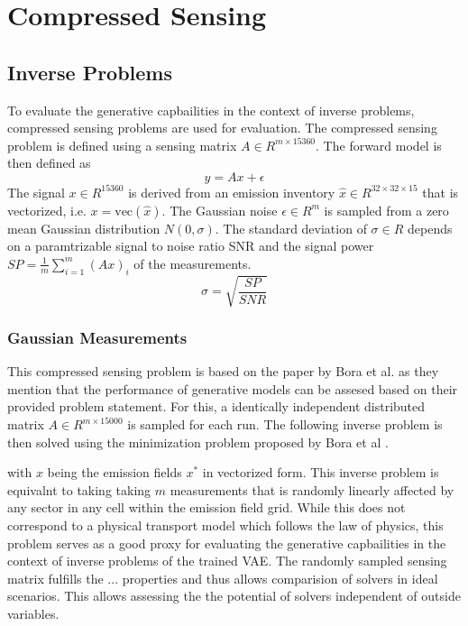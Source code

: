 
\chapter{Compressed Sensing}\label{chapter:compressed_sensing}

\section{Inverse Problems}
To evaluate the generative capbailities in the context of inverse problems, compressed sensing problems are used for evaluation.
The compressed sensing problem is defined using a sensing matrix $A \in R^{m \times 15360}$.
The forward model is then defined as
\begin{equation}
    y = A x + \epsilon
\end{equation}
The signal $x \in R^{15360}$ is derived from an emission inventory $\hat{x} \in R^{32 \times 32 \times 15}$ that is vectorized, i.e. $x = \text{vec}(\hat{x})$.
The Gaussian noise $\epsilon \in R^m$ is sampled from a zero mean Gaussian distribution $N(0, \sigma)$.
The standard deviation of $\sigma \in R$ depends on a paramtrizable signal to noise ratio SNR and the signal power $SP = \frac{1}{m}\sum_{i=1}^m{\left(Ax\right)_i}$ of the measurements.
\begin{equation}
    \sigma = \sqrt{\frac{SP}{SNR}}
\end{equation}

\subsection{Gaussian Measurements}
This compressed sensing problem is based on the paper by Bora et al. as they mention that the performance of generative models can be assesed based on their provided problem statement.
For this, a identically independent distributed matrix $A \in R^{m \times 15000}$ is sampled for each run.
The following inverse problem is then solved using the minimization problem proposed by Bora et al \parencite{CSUsingAI}.

with $x$ being the emission fields $x^*$ in vectorized form.
This inverse problem is equivalnt to taking taking $m$ measurements that is randomly linearly affected by any sector in any cell within the emission field grid.
While this does not correspond to a physical transport model which follows the law of physics, this problem serves as a good proxy for evaluating the generative capbailities in the context of inverse problems of the trained VAE. 
The randomly sampled sensing matrix fulfills the ... properties and thus allows comparision of solvers in ideal scenarios.
This allows assessing the the potential of solvers independent of outside variables.

